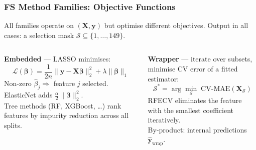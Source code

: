 \documentclass[aspectratio=169]{beamer}
\begin{document}
\begin{frame}
    \frametitle{FS Method Families: Objective Functions}
    \scriptsize
    All families operate on $(\mathbf{X}, \mathbf{y})$ but optimise different objectives.
    Output in all cases: a selection mask $\mathcal{S} \subseteq \{1,\ldots,149\}$.\\[0.4em]
    \begin{columns}[T]
        \textbf{\textcolor{orange!80!black}{Embedded}} --- LASSO minimises:
        \[
            \mathcal{L}(\boldsymbol{\beta}) =
            \frac{1}{2n}\|\mathbf{y}{-}\mathbf{X}\boldsymbol{\beta}\|_2^2
            + \lambda\|\boldsymbol{\beta}\|_1
        \]
        Non-zero $\hat{\beta}_j \Rightarrow$ feature $j$ selected.\\[0.3em]
        ElasticNet adds $\tfrac{\alpha}{2}\|\boldsymbol{\beta}\|_2^2$.\\[0.3em]
        Tree methods (RF, XGBoost, \ldots) rank features by impurity reduction across all splits.

        \textbf{\textcolor{green!50!black}{Wrapper}} --- iterate over subsets,\\
        minimise CV error of a fitted estimator:
        \[
            \mathcal{S}^* = \arg\min_{\mathcal{S}}\; \mathrm{CV\text{-}MAE}(\mathbf{X}_\mathcal{S})
        \]
        RFECV eliminates the feature with the smallest coefficient iteratively.\\[0.3em]
        By-product: internal predictions $\hat{\mathbf{y}}_\text{wrap}$.
    \end{columns}
\end{frame}
\end{document}
